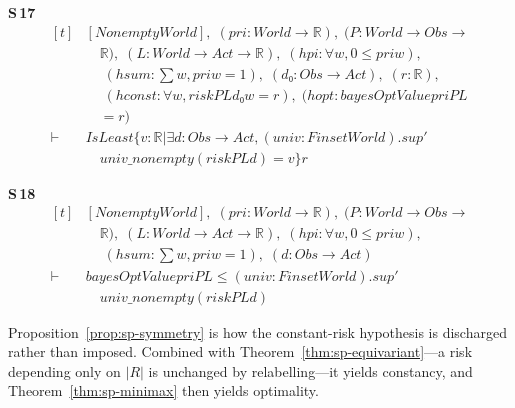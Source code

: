 \noindent\textbf{S\,17}\quad{}
{\footnotesize\[ \begin{aligned}[t]
&[\mathit{Nonempty} \mathit{World}],\; (\mathit{pri} : \mathit{World} \to \mathbb{R} ),\; (\mathit{P} : \mathit{World} \to \mathit{Obs} \to\\
&\quad \mathbb{R} ),\; (\mathit{L} : \mathit{World} \to \mathit{Act} \to \mathbb{R} ),\; (\mathit{hpi} : \forall \mathit{w}, 0 \leq \mathit{pri} \mathit{w}),\\
&\quad \; (\mathit{hsum} : \textstyle\sum \mathit{w}, \mathit{pri} \mathit{w} = 1),\; (\mathit{d₀} : \mathit{Obs} \to \mathit{Act}),\; (\mathit{r} : \mathbb{R} ),\\
&\quad \; (\mathit{hconst} : \forall \mathit{w}, \mathit{risk} \mathit{P} \mathit{L} \mathit{d₀} \mathit{w} = \mathit{r}),\; (\mathit{hopt} : \mathit{bayesOptValue} \mathit{pri} \mathit{P} \mathit{L}\\
&\quad = \mathit{r})\\
\vdash\;&\mathit{IsLeast} \{ \mathit{v} : \mathbb{R} | \exists \mathit{d} : \mathit{Obs} \to \mathit{Act}, (\mathit{univ} : \mathit{Finset} \mathit{World}).\mathit{sup'}\\
&\quad \mathit{univ\_nonempty} (\mathit{risk} \mathit{P} \mathit{L} \mathit{d}) = \mathit{v}\} \mathit{r}
\end{aligned} \]}

\noindent\textbf{S\,18}\quad{}
{\footnotesize\[ \begin{aligned}[t]
&[\mathit{Nonempty} \mathit{World}],\; (\mathit{pri} : \mathit{World} \to \mathbb{R} ),\; (\mathit{P} : \mathit{World} \to \mathit{Obs} \to\\
&\quad \mathbb{R} ),\; (\mathit{L} : \mathit{World} \to \mathit{Act} \to \mathbb{R} ),\; (\mathit{hpi} : \forall \mathit{w}, 0 \leq \mathit{pri} \mathit{w}),\\
&\quad \; (\mathit{hsum} : \textstyle\sum \mathit{w}, \mathit{pri} \mathit{w} = 1),\; (\mathit{d} : \mathit{Obs} \to \mathit{Act})\\
\vdash\;&\mathit{bayesOptValue} \mathit{pri} \mathit{P} \mathit{L} \leq (\mathit{univ} : \mathit{Finset} \mathit{World}).\mathit{sup'}\\
&\quad \mathit{univ\_nonempty} (\mathit{risk} \mathit{P} \mathit{L} \mathit{d})
\end{aligned} \]}


Proposition~\ref{prop:sp-symmetry} is how the constant-risk hypothesis is discharged rather than
imposed. Combined with Theorem~\ref{thm:sp-equivariant}---a risk depending only on $|R|$ is
unchanged by relabelling---it yields constancy, and Theorem~\ref{thm:sp-minimax} then yields
optimality.

